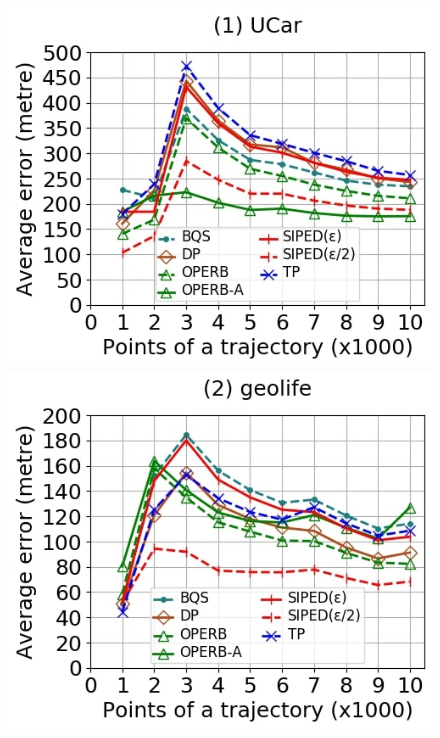 {\begin{figure}[tb!]
	\centering
	\includegraphics[scale=0.250]{Figures/Exp-where-PED-error-size-service.jpg} 	\hspace{0.5ex}
	\includegraphics[scale=0.250]{Figures/Exp-where-PED-error-size-geolife.jpg}	\hspace{0.5ex}

\end{figure}}
